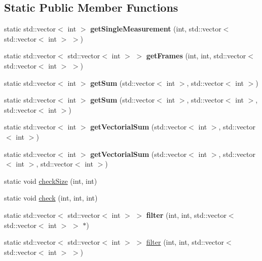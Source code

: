 \subsection*{Static Public Member Functions}
\begin{DoxyCompactItemize}
\item 
\hypertarget{classRoggenBuffer_a6d6d0d7e81c2bc086278bbf88a4a41a0}{
static std::vector$<$ int $>$ {\bfseries getSingleMeasurement} (int, std::vector$<$ std::vector$<$ int $>$ $>$)}
\label{classRoggenBuffer_a6d6d0d7e81c2bc086278bbf88a4a41a0}

\item 
\hypertarget{classRoggenBuffer_a4d137aded6fd7477c6884440aeb0ceb1}{
static std::vector$<$ std::vector$<$ int $>$ $>$ {\bfseries getFrames} (int, int, std::vector$<$ std::vector$<$ int $>$ $>$)}
\label{classRoggenBuffer_a4d137aded6fd7477c6884440aeb0ceb1}

\item 
\hypertarget{classRoggenBuffer_a2dbeae26b5d0b862a3678c72aabf1e7d}{
static std::vector$<$ int $>$ {\bfseries getSum} (std::vector$<$ int $>$, std::vector$<$ int $>$)}
\label{classRoggenBuffer_a2dbeae26b5d0b862a3678c72aabf1e7d}

\item 
\hypertarget{classRoggenBuffer_ab04af345c5d1610685f47403ccf6485e}{
static std::vector$<$ int $>$ {\bfseries getSum} (std::vector$<$ int $>$, std::vector$<$ int $>$, std::vector$<$ int $>$)}
\label{classRoggenBuffer_ab04af345c5d1610685f47403ccf6485e}

\item 
\hypertarget{classRoggenBuffer_a222744a726aafea7dfe7fc45c3bb5367}{
static std::vector$<$ int $>$ {\bfseries getVectorialSum} (std::vector$<$ int $>$, std::vector$<$ int $>$)}
\label{classRoggenBuffer_a222744a726aafea7dfe7fc45c3bb5367}

\item 
\hypertarget{classRoggenBuffer_a1270039b5a4327a2825ec1f7d58f98ae}{
static std::vector$<$ int $>$ {\bfseries getVectorialSum} (std::vector$<$ int $>$, std::vector$<$ int $>$, std::vector$<$ int $>$)}
\label{classRoggenBuffer_a1270039b5a4327a2825ec1f7d58f98ae}

\item 
static void \hyperlink{classRoggenBuffer_ab3ed1a78479fcfa51dbb9b4f94cceab0}{checkSize} (int, int)
\item 
static void \hyperlink{classRoggenBuffer_a36077a6513df2178e6454c32b2baa388}{check} (int, int, int)
\item 
\hypertarget{classRoggenBuffer_a7994937ccf0d890a2699a1fe5eaba841}{
static std::vector$<$ std::vector$<$ int $>$ $>$ {\bfseries filter} (int, int, std::vector$<$ std::vector$<$ int $>$ $>$ $\ast$)}
\label{classRoggenBuffer_a7994937ccf0d890a2699a1fe5eaba841}

\item 
static std::vector$<$ std::vector$<$ int $>$ $>$ \hyperlink{classRoggenBuffer_a23c39bdb6ed6c9c34e545a1cb9c137dd}{filter} (int, int, std::vector$<$ std::vector$<$ int $>$ $>$)
\end{DoxyCompactItemize}


